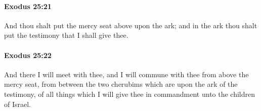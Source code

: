 		\paragraph{Exodus 25:21} %
			\label{EXODUS-25-21}

			And thou shalt put the mercy seat above upon the ark; and in the ark thou shalt put the testimony that I shall give thee.


		\paragraph{Exodus 25:22} %
			\label{EXODUS-25-22}

			And there I will meet with thee, and I will commune with thee from above the mercy seat, from between the two cherubims which are upon the ark of the testimony, of all things which I will give thee in commandment unto the children of Israel.


